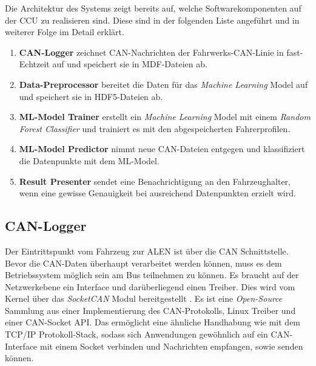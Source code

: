 Die Architektur des Systems zeigt bereits auf, welche Softwarekomponenten auf der CCU zu realisieren sind. Diese sind in der folgenden Liste angeführt und in weiterer Folge im Detail erklärt.

\begin{enumerate}
    \item \textbf{CAN-Logger} zeichnet CAN-Nachrichten der Fahrwerks-CAN-Linie in fast-Echtzeit auf und speichert sie in MDF-Dateien ab.
    \item \textbf{Data-Preprocessor} bereitet die Daten für das \textit{Machine Learning} Model auf und speichert sie in HDF5-Dateien ab.
    \item \textbf{ML-Model Trainer} erstellt ein \textit{Machine Learning} Model mit einem \textit{Random Forest Classifier} und trainiert es mit den abgespeicherten Fahrerprofilen.
    \item \textbf{ML-Model Predictor} nimmt neue CAN-Dateien entgegen und klassifiziert die Datenpunkte mit dem ML-Model.
    \item \textbf{Result Presenter} sendet eine Benachrichtigung an den Fahrzeughalter, wenn eine gewisse Genauigkeit bei ausreichend Datenpunkten erzielt wird.
\end{enumerate}

\subsection{CAN-Logger}
\label{sec:can_logger}

Der Eintrittspunkt vom Fahrzeug zur ALEN ist über die CAN Schnittstelle. Bevor die CAN-Daten überhaupt verarbeitet werden können, muss es dem Betriebssystem möglich sein am Bus teilnehmen zu können. Es braucht auf der Netzwerkebene ein Interface und darüberliegend einen Treiber. Dies wird vom Kernel über das \textit{SocketCAN} Modul bereitgestellt \cite{kleine2012}. Es ist eine \textit{Open-Source} Sammlung aus einer Implementierung des CAN-Protokolls, Linux Treiber und einer CAN-Socket API. Das ermöglicht eine ähnliche Handhabung wie mit dem TCP/IP Protokoll-Stack, sodass sich Anwendungen gewöhnlich auf ein CAN-Interface mit einem Socket verbinden und Nachrichten empfangen, sowie senden können.

